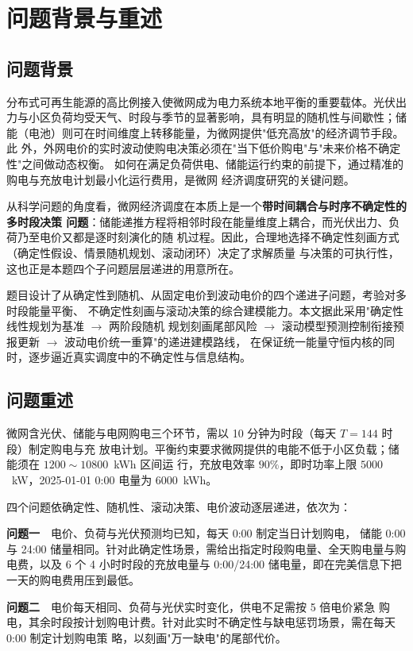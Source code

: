 \documentclass[withoutpreface]{cumcmthesis}
\begin{document}
\section{问题背景与重述}
\subsection{问题背景}
分布式可再生能源的高比例接入使微网成为电力系统本地平衡的重要载体\cite{cn:microgrid}。光伏出
力与小区负荷均受天气、时段与季节的显著影响，具有明显的随机性与间歇性\cite{rp:microgrid}；储
能（电池）则可在时间维度上转移能量，为微网提供"低充高放"的经济调节手段\cite{cn:energy}。此
外，外网电价的实时波动使购电决策必须在"当下低价购电"与"未来价格不确定性"之间做动态权衡。
如何在满足负荷供电、储能运行约束的前提下，通过精准的购电与充放电计划最小化运行费用，是微网
经济调度研究的关键问题\cite{rp:datadriven}。

从科学问题的角度看，微网经济调度在本质上是一个\textbf{带时间耦合与时序不确定性的多时段决策
问题}：储能递推方程将相邻时段在能量维度上耦合，而光伏出力、负荷乃至电价又都是逐时刻演化的随
机过程。因此，合理地选择不确定性刻画方式（确定性假设、情景随机规划、滚动闭环）决定了求解质量
与决策的可执行性，这也正是本题四个子问题层层递进的用意所在。

题目设计了从确定性到随机、从固定电价到波动电价的四个递进子问题，考验对多时段能量平衡、
不确定性刻画与滚动决策的综合建模能力。本文据此采用"确定性线性规划为基准 $\to$ 两阶段随机
规划刻画尾部风险 $\to$ 滚动模型预测控制衔接预报更新 $\to$ 波动电价统一重算"的递进建模路线，
在保证统一能量守恒内核的同时，逐步逼近真实调度中的不确定性与信息结构。

\subsection{问题重述}
微网含光伏、储能与电网购电三个环节，需以 10 分钟为时段（每天 $T=144$ 时段）制定购电与充
放电计划。平衡约束要求微网提供的电能不低于小区负载；储能须在 $1200\sim10800$~kWh 区间运
行，充放电效率 $90\%$，即时功率上限 $5000$~kW，2025-01-01 0:00 电量为 $6000$~kWh。

四个问题依确定性、随机性、滚动决策、电价波动逐层递进，依次为：

\medskip\noindent\textbf{问题一}　电价、负荷与光伏预测均已知，每天 0:00 制定当日计划购电，
储能 0:00 与 24:00 储量相同。针对此确定性场景，需给出指定时段购电量、全天购电量与购电费，以及
6 个 4 小时时段的充放电量与 0:00/24:00 储电量，即在完美信息下把一天的购电费用压到最低。

\medskip\noindent\textbf{问题二}　电价每天相同、负荷与光伏实时变化，供电不足需按 5 倍电价紧急
购电，其余时段按计划购电计费。针对此实时不确定性与缺电惩罚场景，需在每天 0:00 制定计划购电策
略，以刻画"万一缺电"的尾部代价。
\end{document}
